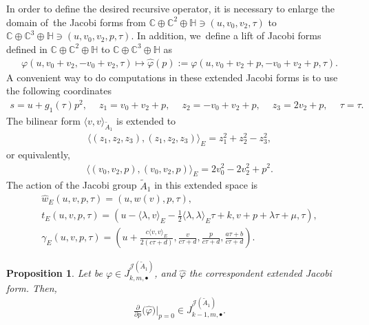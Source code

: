 \documentclass[pdftex]{sigma}%
\numberwithin{equation}{section}
\newtheorem{Proposition}[Theorem]{Proposition}
 { \theoremstyle{definition}
\newtheorem{Definition}[Theorem]{Definition}
\newtheorem{Remark}[Theorem]{Remark} }
\newcommand{\Ja}{\mathcal{J}}
\begin{document}
In order to define the desired recursive operator, it is necessary to enlarge the domain of~the Jacobi forms from $\mathbb{C}\oplus\mathbb{C}^2\oplus\mathbb{H}\ni (u,v_0,v_2,\tau)$ to $\mathbb{C}\oplus\mathbb{C}^3\oplus\mathbb{H}\ni (u,v_0,v_2,p,\tau)$. In addition, we~define a lift of Jacobi forms defined in $ \mathbb{C}\oplus\mathbb{C}^2\oplus\mathbb{H}$ to $\mathbb{C}\oplus\mathbb{C}^3\oplus\mathbb{H}$ as
\begin{gather*}
\varphi(u,v_0+v_2,-v_0+v_2,\tau)\mapsto \hat\varphi(p):=\varphi(u,v_0+v_2+p,-v_0+v_2+p,\tau).
\end{gather*}
A convenient way to do computations in these extended Jacobi forms is to use the following coordinates
\begin{gather*}
s=u+g_1(\tau)p^2,\quad\
z_1=v_0+v_2+p,\quad\
z_2=-v_0+v_2+p,\quad\
z_3=2v_2+p,\quad\
\tau=\tau.
\end{gather*}
The bilinear form $\langle v,v \rangle_{\tilde A_1}$ is extended to
\begin{gather*}
\langle (z_1,z_2,z_3),(z_1,z_2,z_3) \rangle_E=z_1^2+z_2^2-z_3^2,
\end{gather*}
or equivalently,
\begin{gather*}
\langle (v_0,v_2,p),(v_0,v_2,p) \rangle_E=2v_0^2-2v_2^2+p^2.
\end{gather*}
The action of the Jacobi group $\tilde A_1$ in this extended space is
\begin{gather*}%
\hat w_E(u,v,p,\tau)=(u,w(v),p,\tau),
\\
t_E(u,v,p,\tau)=\left(u-\langle \lambda,v \rangle_{E}-\frac{1}{2}\langle \lambda,\lambda \rangle_{E}\tau+k,v+p+\lambda\tau+\mu,\tau\right),
\\
\gamma_E(u,v,p,\tau)=\left(u+\frac{c\langle v,v \rangle_{E}}{2(c\tau+d)},\frac{v}{c\tau+d},\frac{p}{c\tau+d},\frac{a\tau+b}{c\tau+d}\right).
\end{gather*}

\begin{Proposition}
Let be $\varphi\in J_{k, m,\bullet}^{\Ja(\tilde A_1)}$, and $\hat\varphi$ the correspondent extended Jacobi form. Then,
\begin{gather*}
\frac{\partial}{\partial p}\big(\hat\varphi\big)\bigg|_{p=0} \in J_{k-1, m,\bullet}^{\Ja(\tilde A_1)}.
\end{gather*}
\end{Proposition}
\end{document}

